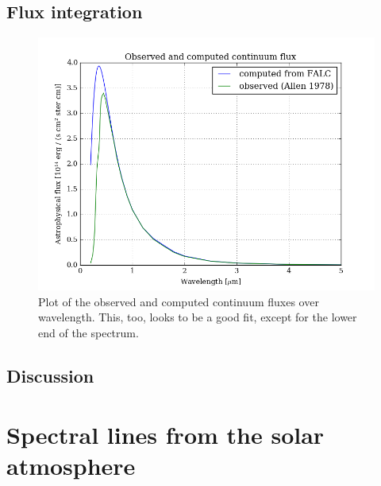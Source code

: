 \documentclass[11pt,a4paper,notitlepage]{article}
\begin{document}
\subsection{Flux integration}

\begin{figure}[H]
\center
	\includegraphics[scale=0.42]{../figs/2flux.png}
	\caption{Plot of the observed and computed continuum fluxes over wavelength. This, too, looks to be a good fit, except for the lower end of the spectrum.}
\end{figure}


\subsection{Discussion}


\section{Spectral lines from the solar atmosphere} 						%
\end{document}
